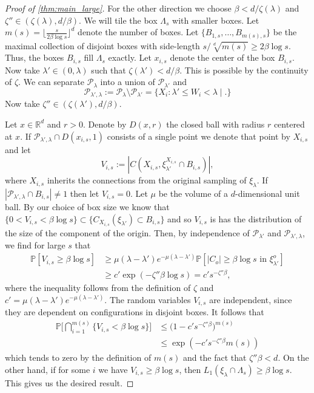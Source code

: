 \documentclass[a4paper,12pt]{scrartcl}
\renewcommand{\P}{\mathbb{P}}
\newcommand{\reals}{\mathbb{R}}
\newcommand{\set}[2]{\big\{ #1 \mid #2 \big\}}
\theoremstyle{definition}
\theoremstyle{remark}
\begin{document}
\begin{proof}[Proof of \autoref{thm:main_large}]
    For the other direction we choose $\beta < {d}/{\zeta(\lambda)}$ and $\zeta''\in(\zeta(\lambda), d / \beta)$.
    We will tile the box $\Lambda_s$ with smaller boxes.
    Let $m(s) = \lfloor\frac{s}{2\beta\log s}\rfloor^d$ denote the number of boxes.
    Let $\{B_{1,s},\dots, B_{m(s), s}\}$ be the maximal collection of disjoint boxes with side-length $s/\sqrt[d]{m(s)}\geq 2\beta \log s$.
    Thus, the boxes $B_{i,s}$ fill $\Lambda_s$ exactly.
    Let $x_{i,s}$ denote the center of the box $B_{i,s}$.
    Now take $\lambda'\in(0,\lambda)$ such that $\zeta(\lambda')<d/\beta$.
    This is possible by the continuity of $\zeta$.
    We can separate $\mathcal P_\lambda$ into a union of $\mathcal P_{\lambda'}$ and
    $$
    \mathcal P_{\lambda', \lambda} := \mathcal P_\lambda \setminus \mathcal
    P_{\lambda'}
    =
    \set
    {X_i:
    \lambda'\leq W_i<\lambda}.
    $$
    Now take $\zeta'' \in (\zeta(\lambda'),d/\beta)$.

    Let $x\in\reals^d$ and $r>0$. Denote by $D(x, r)$ the closed ball with radius $r$ centered at $x$. If $\mathcal P_{\lambda', \lambda}\cap D(x_{i,s}, 1)$ consists of a single point we denote that point by $X_{i,s}$ and let
    $$
    V_{i,s}
    :=
    |C
    (X_{i,s}, \mathcal \xi^{X_{i,s}}_{\lambda'}\cap B_{i,s})
    |,
    $$
    where $X_{i,s}$ inherits the connections from the original sampling of $\xi_{\lambda}$.
    If $|\mathcal P_{\lambda', \lambda}\cap B_{i,s}|\neq 1$ then let $V_{i,s} = 0$.
    Let $\mu$ be the volume of a $d$-dimensional unit ball. By our choice of box size we know that $\{0<V_{i,s}<\beta\log s\}\subset\{C_{X_{i,s}}(\xi_{\lambda'})\subset B_{i,s}\}$ and so $V_{i,s}$ is has the distribution of the size of the component of the origin. Then, by independence of $\mathcal P_{\lambda'}$ and $\mathcal P_{\lambda', \lambda}$, we find for large $s$ that
    \begin{align*}
      \P[V_{i,s}\geq \beta \log s]
      & \geq
      \mu (\lambda-\lambda')e^{-\mu(\lambda-\lambda')}
      \P[
        |C_o| \geq \beta\log s
        \text{ in }\xi_{\lambda'}^o
      ]                                                           \\
      & \geq c'\exp(-\zeta''\beta \log s) = c's^{-\zeta''\beta},
    \end{align*}
    where the inequality follows from the definition of $\zeta$ and $c'=\mu(\lambda-\lambda')e^{-\mu(\lambda-\lambda')}$. The random variables $V_{i,s}$ are independent, since they are dependent on configurations in disjoint boxes. It follows that
    \begin{align*}
      \P\Big[
        \bigcap_{i=1}^{m(s)} \{V_{i,s}<\beta\log s\}
      \Big]
      & \leq
      \big(
        1-c's^{-\zeta''\beta}
      \big)^{m(s)}
      \\
      & \leq \exp(-c's^{-\zeta''\beta}m(s))
    \end{align*}
    which tends to zero by the definition of $m(s)$ and the fact that $\zeta''\beta < d$. On the other hand, if for some $i$ we have $V_{i,s}\geq \beta \log s$, then $L_1(\xi_{\lambda}\cap \Lambda_s)\geq \beta \log s$. This gives us the desired result.
  \end{proof}
\end{document}
